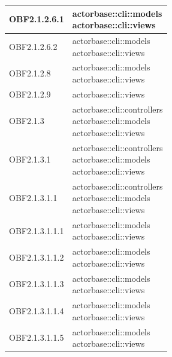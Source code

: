 \documentclass{scalatekids-article}
\begin{document}
\begin{longtable}[H]{|p{3.5cm}|p{7.5cm}|}
\hline
OBF2.1.2.6.1 & \multiLineCell[t]{actorbase::cli::models\\actorbase::cli::views\\}\\
\hline
OBF2.1.2.6.2 & \multiLineCell[t]{actorbase::cli::models\\actorbase::cli::views\\}\\
\hline
OBF2.1.2.8 & \multiLineCell[t]{actorbase::cli::models\\actorbase::cli::views\\}\\
\hline
OBF2.1.2.9 & \multiLineCell[t]{actorbase::cli::views\\}\\
\hline
OBF2.1.3 & \multiLineCell[t]{actorbase::cli::controllers\\actorbase::cli::models\\actorbase::cli::views\\}\\
\hline
OBF2.1.3.1 & \multiLineCell[t]{actorbase::cli::controllers\\actorbase::cli::models\\actorbase::cli::views\\}\\
\hline
OBF2.1.3.1.1 & \multiLineCell[t]{actorbase::cli::controllers\\actorbase::cli::models\\actorbase::cli::views\\}\\
\hline
OBF2.1.3.1.1.1 & \multiLineCell[t]{actorbase::cli::models\\actorbase::cli::views\\}\\
\hline
OBF2.1.3.1.1.2 & \multiLineCell[t]{actorbase::cli::models\\actorbase::cli::views\\}\\
\hline
OBF2.1.3.1.1.3 & \multiLineCell[t]{actorbase::cli::models\\actorbase::cli::views\\}\\
\hline
OBF2.1.3.1.1.4 & \multiLineCell[t]{actorbase::cli::models\\actorbase::cli::views\\}\\
\hline
OBF2.1.3.1.1.5 & \multiLineCell[t]{actorbase::cli::models\\actorbase::cli::views\\}\\

\end{longtable}
\end{document}
